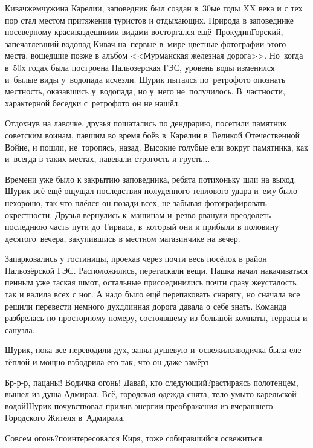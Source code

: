 Кивач\mdash жемчужина Карелии, заповедник был создан в~30\sdash ые годы XX века и с тех пор стал местом притяжения туристов и отдыхающих. Природа в заповеднике по\sdash северному красива\mdash здешними видами восторгался ещё~Прокудин\sdash Горский, запечатлевший водопад Кивач на~первые в~мире цветные фотографии этого места, вошедшие позже в альбом <<Мурманская железная дорога>>. Но~когда в~50\sdash х годах была построена Пальозерская ГЭС, уровень воды изменился и~былые виды у~водопада исчезли. Шурик пытался по~ретро\sdash фото\cite{ПрокудинГорский} опознать местность, оказавшись у~водопада, но у~него не~получилось. В~частности, характерной беседки с~ретро\sdash фото он не нашёл.

Отдохнув на лавочке, друзья пошатались по дендрарию, посетили памятник советским воинам, павшим во время боёв в~Карелии в~Великой Отечественной Войне, и пошли, не~торопясь, назад. Высокие голубые ели вокруг памятника, как и~всегда в таких местах, навевали строгость и грусть$\ldots$ 

Времени уже было к закрытию заповедника, ребята потихоньку шли на выход. Шурик всё ещё ощущал последствия полуденного теплового удара и~ему было нехорошо, так что плёлся он позади всех, не забывая фотографировать окрестности. Друзья вернулись к~машинам и~резво рванули преодолеть последнюю часть пути до~Гирваса, в~который они и прибыли в половину десятого~вечера, закупившись в местном магазинчике на вечер.

Запарковались у гостиницы, проехав через почти весь посёлок в район Пальозёрской ГЭС. Расположились, перетаскали вещи. Пашка начал накачиваться пенным уже таская шмот, остальные присоединились почти сразу же\mdash усталость так и валила всех с ног. А надо было ещё перепаковать снарягу, но сначала все решили перевести немного дух\mdash длинная дорога давала о себе знать. Команда разбрелась по просторному номеру, состоявшему из большой комнаты, террасы и санузла. 

\newpage
Шурик, пока все переводили дух, занял душевую и~освежился\mdash водичка была еле тёплой и мощно взбодрила его так, что он даже замёрз.

\diagdash Бр-р-р, пацаны! Водичка огонь! Давай, кто следующий?\mdash растираясь полотенцем, вышел из душа Адмирал. Всё, городская одежда снята, тело умыто карельской водой\mdash Шурик почувствовал прилив энергии преображения из вчерашнего Городского Жителя в~Адмирала.

\diagdash Совсем огонь?\mdash поинтересовался Киря, тоже собиравшийся освежиться.

